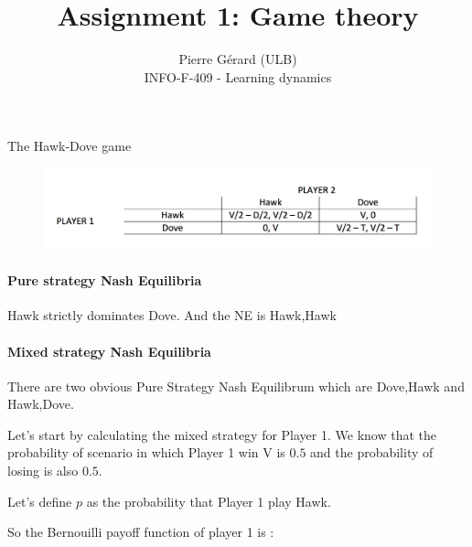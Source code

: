 \documentclass[11pt]{article}
\newenvironment{exercise}[2][Exercise]{\begin{trivlist}
\item[\hskip \labelsep {\bfseries #1}\hskip \labelsep {\bfseries #2.}]}{\end{trivlist}}
\begin{document}
 
 
\setlength\parindent{0pt}
 
\title{Assignment 1: Game theory}%
\author{Pierre Gérard (ULB)\\ %
INFO-F-409 - Learning dynamics} %
 
\maketitle

\begin{exercise}{1} The Hawk-Dove game
\end{exercise}

\begin{figure}[H]
   \includegraphics[width=\textwidth]{img/exo1.png}
\end{figure}

\paragraph{Pure strategy Nash Equilibria}

Hawk strictly dominates Dove. And the NE is Hawk,Hawk  

\paragraph{Mixed strategy Nash Equilibria}

There are two obvious Pure Strategy Nash Equilibrum which are Dove,Hawk and Hawk,Dove.

Let's start by calculating the mixed strategy for Player 1. We know that the probability of scenario in which Player 1 win V is $0.5$ and the probability of losing is also $0.5$.

Let's define $p$ as the probability that Player 1 play Hawk.

So the Bernouilli payoff function of player 1 is :
\end{document}
